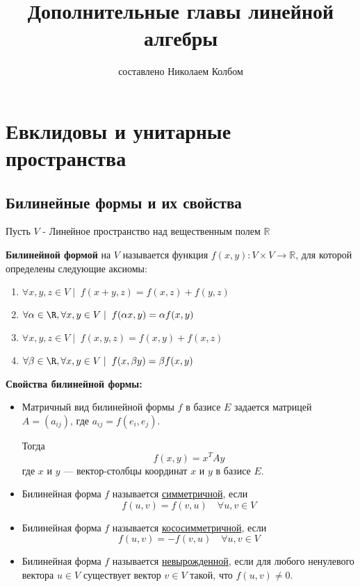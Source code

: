 \documentclass[12px]{report}
\title{Дополнительные главы линейной алгебры}
\author{составлено Николаем Колбом}
\begin{document}
  \maketitle
  \tableofcontents

  \chapter{Евклидовы и унитарные пространства}

  \section{Билинейные формы и их свойства}

\large Пусть $V$ - Линейное пространство над вещественным полем $\mathbb{R}$

\vspace{0.5cm}


\begin{shdef}
    \begin{definition}
        \leavevmode\newline
        
        \textbf{Билинейной формой} на $V$ называется функция $f(x,y): V \times V \to \mathbb{R}$, для которой определены следующие аксиомы:
        \begin{enumerate}
            \item $\forall x,y,z \in V \mid \; f(x+y,z) = f(x, z) + f(y,z)$
            \item $\forall \alpha \in \R, \forall x,y \in V \mid \;  f(\alpha x, y) = \alpha f(x,y)$
            \item $\forall x, y, z \in V \mid \; f(x,y,z) = f(x,y) + f(x,z)$
            \item $\forall \beta \in \R, \forall x, y \in V \mid \; f(x, \beta y) = \beta f(x,y)$
        \end{enumerate}
    \end{definition}
\end{shdef}

\vspace{0.5cm}
\textbf{Свойства билинейной формы:}

\begin{itemize}
    \item Матричный вид билинейной формы $f$ в базисе $E$ задается матрицей $A = (a_{ij})$, где $a_{ij} = f(e_i, e_j)$. 

    Тогда
    \[
    f(x, y) = x^T A y
    \]
    где $x$ и $y$ — вектор-столбцы координат $x$ и $y$ в базисе $E$.
    \item Билинейная форма $f$ называется \underline{симметричной}, если
    \[
    f(u, v) = f(v, u) \quad \forall u, v \in V
    \]
    \item Билинейная форма $f$ называется \underline{кососимметричной}, если
    \[
    f(u, v) = -f(v, u) \quad \forall u, v \in V
    \]
    \item Билинейная форма $f$ называется \underline{невырожденной}, если для любого ненулевого вектора $u \in V$ существует вектор $v \in V$ такой, что $f(u, v) \neq 0$.
\end{itemize}
\end{document}
